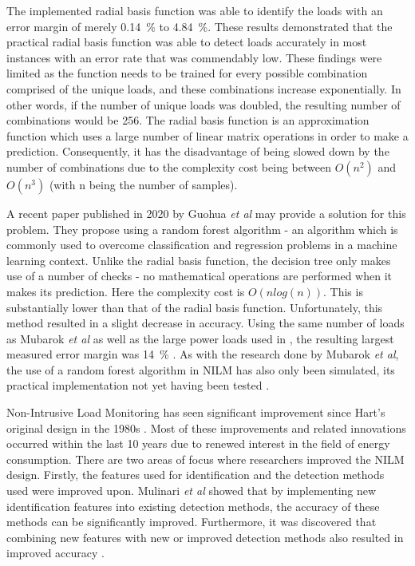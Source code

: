  The implemented radial basis function was able to identify the loads with an error margin of merely \qty{0.14}{\%} to \qty{4.84}{\%}. These results demonstrated that the practical radial basis function was able to detect loads accurately in most instances with an error rate that was commendably low. These findings were limited as the function needs to be trained for every possible combination comprised of the unique loads, and these combinations increase exponentially. In other words, if the number of unique loads was doubled, the resulting number of combinations would be 256. The radial basis function is an approximation function which uses a large number of linear matrix operations in order to make a prediction. Consequently, it has the disadvantage of being slowed down by the number of combinations due to the complexity cost being between $O(n^{2})$ and $O(n^{3})$ (with n being the number of samples).
 \par
A recent paper published in 2020 by Guohua \emph{et al} \cite{RN39} may provide a solution for this problem. They propose using a random forest algorithm - an algorithm which is commonly used to overcome classification and regression problems in a machine learning context. Unlike the radial basis function, the decision tree only makes use of a number of checks - no mathematical operations are performed when it makes its prediction. Here the complexity cost is $O(n log (n))$. This is substantially lower than that of the radial basis function.
Unfortunately, this method resulted in a slight decrease in accuracy. Using the same number of loads as Mubarok \emph{et al} as well as the large power loads used in \cite{8895360,RN38,RN40}, the resulting largest measured error margin was \qty{14}{\%} \cite{RN47}. 
As with the research done by Mubarok \emph{et al}, the use of a random forest algorithm in NILM has also only been simulated, its practical implementation not yet having been tested \cite{RN47}.
\par
Non-Intrusive Load Monitoring has seen significant improvement since Hart's original design in the 1980s \cite{RN42}. Most of these improvements and related innovations occurred within the last 10 years due to renewed interest in the field of energy consumption. There are two areas of focus where researchers improved the NILM design.
Firstly, the features used for identification and the detection methods used were improved upon. Mulinari \emph{et al} \cite{8895360} showed that by implementing new identification features into existing detection methods, the accuracy of these methods can be significantly improved. Furthermore, it was discovered that combining new features with new or improved detection methods also resulted in improved accuracy \cite{RN39,RN38,RN40,RN47}. 
